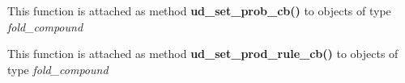 \begin{DoxyRefList}
\item[\label{wrappers__wrappers000073}%
\Hypertarget{wrappers__wrappers000073}%
Global \mbox{\hyperlink{unstructured__domains_8h_a13ac877c9db89a1a5b5d9c0394148595}{vrna\+\_\+ud\+\_\+set\+\_\+prob\+\_\+cb}} (vrna\+\_\+fold\+\_\+compound\+\_\+t $\ast$vc, vrna\+\_\+callback\+\_\+ud\+\_\+probs\+\_\+add $\ast$setter, vrna\+\_\+callback\+\_\+ud\+\_\+probs\+\_\+get $\ast$getter)]This function is attached as method {\bfseries ud\+\_\+set\+\_\+prob\+\_\+cb()} to objects of type {\itshape fold\+\_\+compound}  
\item[\label{wrappers__wrappers000071}%
\Hypertarget{wrappers__wrappers000071}%
Global \mbox{\hyperlink{group__domains__up_ga745a99f0bc72898d54de16f6e538828a}{vrna\+\_\+ud\+\_\+set\+\_\+prod\+\_\+rule\+\_\+cb}} (vrna\+\_\+fold\+\_\+compound\+\_\+t $\ast$vc, vrna\+\_\+callback\+\_\+ud\+\_\+production $\ast$pre\+\_\+cb, vrna\+\_\+callback\+\_\+ud\+\_\+energy $\ast$e\+\_\+cb)]This function is attached as method {\bfseries ud\+\_\+set\+\_\+prod\+\_\+rule\+\_\+cb()} to objects of type {\itshape fold\+\_\+compound} 
\end{DoxyRefList}